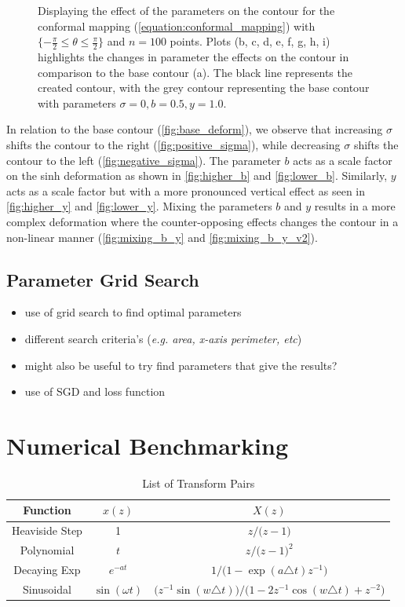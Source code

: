 \documentclass[a4paper]{report}
\begin{document}
\begin{figure}[ht]
    \caption{Displaying the effect of the parameters on the contour for the conformal mapping (\ref{equation:conformal_mapping}) with $\{-\frac{\pi}{2} \leq \theta \leq \frac{\pi}{2} \}$ and $n = 100$ points. Plots (b, c, d, e, f, g, h, i) highlights the changes in parameter the effects on the contour in comparison to the base contour (a). The black line represents the created contour, with the grey contour representing the base contour with parameters $\sigma = 0, b = 0.5, y = 1.0$.}
\end{figure}

In relation to the base contour (\autoref{fig:base_deform}), we observe that increasing $\sigma$ shifts the contour to the right (\autoref{fig:positive_sigma}), while decreasing $\sigma$ shifts the contour to the left (\autoref{fig:negative_sigma}). The parameter $b$ acts as a scale factor on the sinh deformation as shown in \autoref{fig:higher_b} and \ref{fig:lower_b}. Similarly, $y$ acts as a scale factor but with a more pronounced vertical effect as seen in \autoref{fig:higher_y} and \ref{fig:lower_y}. Mixing the parameters $b$ and $y$ results in a more complex deformation where the counter-opposing effects changes the contour in a non-linear manner (\autoref{fig:mixing_b_y} and \ref{fig:mixing_b_y_v2}).

\subsection{Parameter Grid Search}
\begin{itemize}
    \item use of grid search to find optimal parameters
    \item different search criteria's (\textit{e.g. area, x-axis perimeter, etc})
    \item might also be useful to try find parameters that give the results?
    \item use of SGD and loss function
\end{itemize}

\section{Numerical Benchmarking}

\begin{table}[h]
    \centering
    \begin{tabular}{c|cc}
    \hline
    \textbf{Function} & $x(z)$ & $X(z)$ \\
    \hline
    Heaviside Step & 1 & $z / \textbf{(}z-1\textbf{)}$ \\
    Polynomial & \(t\) & $z / \textbf{(}z-1\textbf{)}^2 $ \\
    Decaying Exp & $e^{-at}$ & $1 / \textbf{(}1 - \exp(a\triangle t) z^{-1}\textbf{)}$ \\
    Sinusoidal & $\sin(\omega t)$ & $\textbf{(}z^{-1}\sin(w\triangle t)\textbf{)} / \textbf{(}1-2z^{-1}\cos(w\triangle t) + z^{-2}\textbf{)}$
    \end{tabular}
    \caption{List of Transform Pairs}
    \label{tab:transform_pairs}
\end{table}
\end{document}
